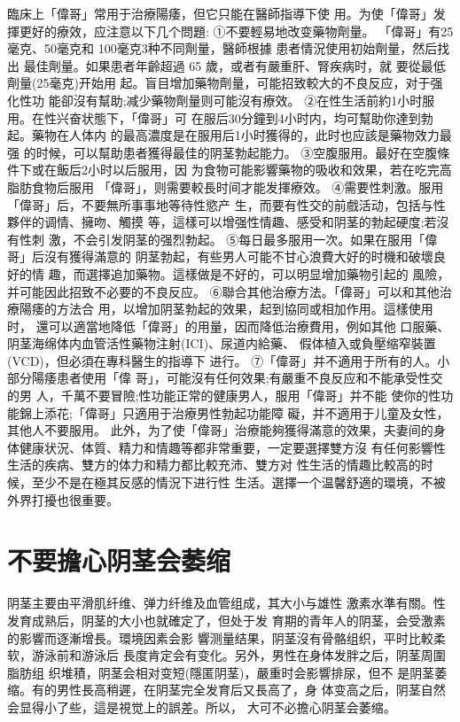 \documentclass[12pt,UTF8]{ctexbook}
\begin{document}
臨床上「偉哥」常用于治療陽痿，但它只能在醫師指導下使
用。为使「偉哥」发揮更好的療效，应注意以下几个問題:
①不要輕易地改变藥物劑量。
「偉哥」有25毫克、50毫克和
100毫克3种不同劑量，醫師根據
患者情況使用初始劑量，然后找出
最佳劑量。如果患者年齡超過 65
歲，或者有嚴重肝、腎疾病时，就
要從最低劑量(25毫克)开始用
起。盲目增加藥物劑量，可能招致較大的不良反应，对于强化性功
能卻沒有幫助;减少藥物劑量则可能沒有療效。
②在性生活前約1小时服用。在性兴奋状態下，「偉哥」可
在服后30分鐘到4小时内，均可幫助你達到勃起。藥物在人体内
的最高濃度是在服用后1小时獲得的，此时也应該是藥物效力最强
的时候，可以幫助患者獲得最佳的阴茎勃起能力。
③空腹服用。最好在空腹條件下或在飯后2小时以后服用，因
为食物可能影響藥物的吸收和效果，若在吃完高脂肪食物后服用
「偉哥」，则需要較長时间才能发揮療效。
④需要性刺激。服用「偉哥」后，不要無所事事地等待性慾产
生，而要有性交的前戲活动，包括与性夥伴的调情、擁吻、觸摸
等，這樣可以增强性情趣、感受和阴茎的勃起硬度;若沒有性刺
激，不会引发阴茎的强烈勃起。
⑤每日最多服用一次。如果在服用「偉哥」后沒有獲得滿意的
阴茎勃起，有些男人可能不甘心浪費大好的时機和破壞良好的情
趣，而選擇追加藥物。這樣做是不好的，可以明显增加藥物引起的
風險，并可能因此招致不必要的不良反应。
⑥聯合其他治療方法。「偉哥」可以和其他治療陽痿的方法合
用，以增加阴茎勃起的效果，起到協同或相加作用。這樣使用时，
還可以適當地降低「偉哥」的用量，因而降低治療費用，例如其他
口服藥、阴茎海绵体内血管活性藥物注射(ICI)、尿道内給藥、
假体植入或負壓缩窄裝置(VCD)，但必須在專科醫生的指導下
进行。
⑦「偉哥」并不適用于所有的人。小部分陽痿患者使用「偉
哥」，可能沒有任何效果;有嚴重不良反应和不能承受性交的男
人，千萬不要冒險;性功能正常的健康男人，服用「偉哥」并不能
使你的性功能錦上添花;「偉哥」只適用于治療男性勃起功能障
礙，并不適用于儿童及女性，其他人不要服用。
此外，为了使「偉哥」治療能夠獲得滿意的效果，夫妻间的身
体健康状況、体質、精力和情趣等都非常重要，一定要選擇雙方沒
有任何影響性生活的疾病、雙方的体力和精力都比較充沛、雙方对
性生活的情趣比較高的时候，至少不是在極其反感的情況下进行性
生活。選擇一个温馨舒適的環境，不被外界打擾也很重要。
\section{不要擔心阴茎会萎缩}
阴茎主要由平滑肌纤维、弹力纤维及血管组成，其大小与雄性
激素水準有關。性发育成熟后，阴茎的大小也就確定了，但处于发
育期的青年人的阴茎，会受激素的影響而逐漸增長。環境因素会影
響测量结果，阴茎沒有骨骼组织，平时比較柔软，游泳前和游泳后
長度肯定会有变化。另外，男性在身体发胖之后，阴茎周圍脂肪组
织堆積，阴茎会相对变短(隱匿阴茎)，嚴重时会影響排尿，但不
是阴茎萎缩。有的男性長高稍遲，在阴茎完全发育后又長高了，身
体变高之后，阴茎自然会显得小了些，這是視觉上的誤差。所以，
大可不必擔心阴茎会萎缩。
\end{document}
